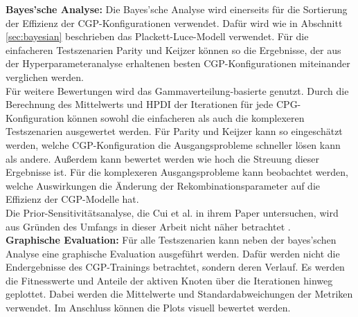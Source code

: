 \textbf{Bayes'sche Analyse:} Die Bayes'sche Analyse wird einerseits für die Sortierung der Effizienz der CGP-Konfigurationen verwendet. 
Dafür wird wie in Abschnitt \ref{sec:bayesian} beschrieben das Plackett-Luce-Modell verwendet.
Für die einfacheren Testszenarien Parity und Keijzer können so die Ergebnisse, der aus der Hyperparameteranalyse erhaltenen besten CGP-Konfigurationen miteinander verglichen werden.\\
Für weitere Bewertungen wird das Gammaverteilung-basierte genutzt.
Durch die Berechnung des Mittelwerts und HPDI der Iterationen für jede CPG-Konfiguration können sowohl die einfacheren als auch die komplexeren Testszenarien ausgewertet werden.
Für Parity und Keijzer kann so eingeschätzt werden, welche CGP-Konfiguration die Ausgangsprobleme schneller lösen kann als andere.
Außerdem kann bewertet werden wie hoch die Streuung dieser Ergebnisse ist.
Für die komplexeren Ausgangsprobleme kann beobachtet werden, welche Auswirkungen die Änderung der Rekombinationsparameter auf die Effizienz der CGP-Modelle hat.\\
Die Prior-Sensitivitätsanalyse, die Cui et al. in ihrem Paper untersuchen, wird aus Gründen des Umfangs in dieser Arbeit nicht näher betrachtet \cite{cui_equidistant_2023}.\\

\textbf{Graphische Evaluation:} Für alle Testszenarien kann neben der bayes'schen Analyse eine graphische Evaluation ausgeführt werden.
Dafür werden nicht die Endergebnisse des CGP-Trainings betrachtet, sondern deren Verlauf.
Es werden die Fitnesswerte und Anteile der aktiven Knoten über die Iterationen hinweg geplottet.
Dabei werden die Mittelwerte und Standardabweichungen der Metriken verwendet.
Im Anschluss können die Plots visuell bewertet werden.\\

